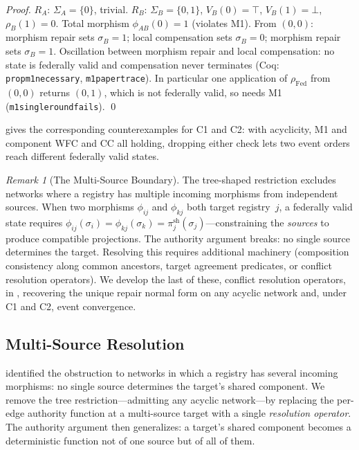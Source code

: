 \documentclass[11pt,a4paper]{article}
\theoremstyle{plain}
\theoremstyle{definition}
\theoremstyle{remark}
\newtheorem{remark}[theorem]{Remark}
\newcommand{\Fed}{\mathrm{Fed}}
\renewcommand{\_}{\textunderscore\allowbreak}
\begin{document}
\begin{proof}
$R_A$: $\Sigma_A = \{0\}$, trivial.  $R_B$: $\Sigma_B = \{0, 1\}$,
$V_B(0) = \top$, $V_B(1) = \bot$, $\rho_B(1) = 0$.  Total morphism
$\phi_{AB}(0) = 1$ (violates M1).  From $(0, 0)$: morphism repair sets
$\sigma_B = 1$; local compensation sets $\sigma_B = 0$; morphism repair
sets $\sigma_B = 1$.  Oscillation between morphism repair and local
compensation: no state is federally valid and compensation never terminates
(Coq: \texttt{prop\_m1\_necessary}, \texttt{m1\_paper\_trace}).  In
particular one application of $\rho_\Fed$ from $(0,0)$ returns $(0,1)$, which
is not federally valid, so  needs M1
(\texttt{m1\_single\_round\_fails}). \qed
\end{proof}

 gives the corresponding counterexamples for C1 and C2:
with acyclicity, M1 and component WFC and CC all holding, dropping either check
lets two event orders reach different federally valid states.

\begin{remark}[The Multi-Source Boundary]
\label{rem:multisource}
The tree-shaped restriction excludes networks where a registry has multiple
incoming morphisms from independent sources.  When two morphisms
$\phi_{ij}$ and $\phi_{kj}$ both target registry~$j$, a federally valid
state requires $\phi_{ij}(\sigma_i) = \phi_{kj}(\sigma_k) =
\pi_j^{\mathrm{sh}}(\sigma_j)$---constraining the \emph{sources} to produce
compatible projections.  The authority argument breaks: no single source
determines the target.  Resolving this requires additional machinery
(composition consistency along common ancestors, target agreement predicates,
or conflict resolution operators).  We develop the last of these, conflict
resolution operators, in , recovering the unique repair
normal form on any acyclic network and, under C1 and C2, event convergence.
\end{remark}

\subsection{Multi-Source Resolution}
\label{sec:multisource}

 identified the obstruction to networks in which a
registry has several incoming morphisms: no single source determines the
target's shared component.  We remove the tree restriction---admitting any
acyclic network---by replacing the per-edge authority function at a multi-source
target with a single \emph{resolution operator}.  The authority argument then
generalizes: a target's shared component becomes a deterministic function not of
one source but of all of them.
\end{document}
